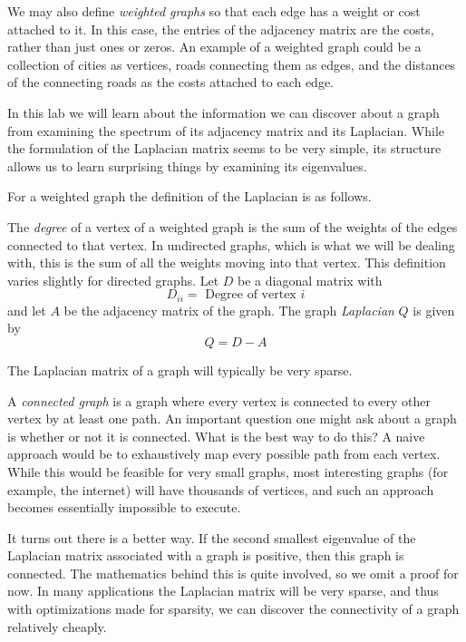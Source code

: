 We may also define \emph{weighted graphs} so that each edge has a weight or cost attached to it.
In this case, the entries of the adjacency matrix are the costs, rather than just ones or zeros.
An example of a weighted graph could be a collection of cities as vertices, roads connecting them as edges, and the distances of the connecting roads as the costs attached to each edge.

In this lab we will learn about the information we can discover about a graph from examining the spectrum of its adjacency matrix and its Laplacian.
While the formulation of the Laplacian matrix seems to be very simple, its structure allows us to learn surprising things by examining its eigenvalues.

For a weighted graph the definition of the Laplacian is as follows.

\begin{definition}  The \emph{degree} of a vertex of a weighted graph is the sum of the weights of the edges connected to that vertex.
In undirected graphs, which is what we will be dealing with, this is the sum of all the weights moving into that vertex.
This definition varies slightly for directed graphs.
Let $D$ be a diagonal matrix with
\[
D_{ii} = \mbox{ Degree of vertex $i$}
\]
and let $A$ be the adjacency matrix of the graph.
The graph \emph{Laplacian} $Q$ is given by
\[
Q = D-A
\]
\end{definition}

The Laplacian matrix of a graph will typically be very sparse.

A \emph{connected graph} is a graph where every vertex is connected to every other vertex by at least one path.
An important question one might ask about a graph is whether or not it is connected.
What is the best way to do this?
A naive approach would be to exhaustively map every possible path from each vertex.
While this would be feasible for very small graphs, most interesting graphs (for example, the internet) will have thousands of vertices, and such an approach becomes essentially impossible to execute.

It turns out there is a better way.
If the second smallest eigenvalue of the Laplacian matrix associated with a graph is positive, then this graph is connected.
The mathematics behind this is quite involved, so we omit a proof for now.
In many applications the Laplacian matrix will be very sparse, and thus with optimizations made for sparsity, we can discover the connectivity of a graph relatively cheaply.

